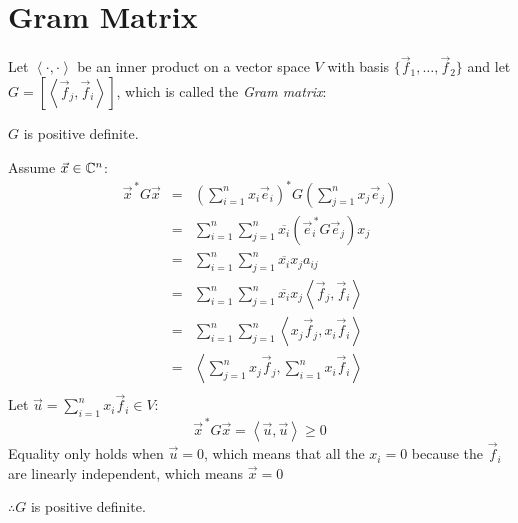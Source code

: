 \documentclass[letterpaper,12pt,fleqn]{article}
\newcommand{\inner}[2]{\left<#1,#2\right>}
\newcommand{\conj}[1]{\overline{#1}}
\newcommand{\vx}{\vec{x}}
\newcommand{\vxct}{\vx^{\,*}}
\newcommand{\ve}{\vec{e}}
\newcommand{\vect}{\ve^{\,*}}
\newcommand{\vf}{\vec{f}}
\newcommand{\vu}{\vec{u}}
\begin{document}
\section*{Gram Matrix}

\begin{theorem}
  Let $\inner{\cdot}{\cdot}$ be an inner product on a vector space $V$ with
  basis $\{\vf_1,\ldots,\vf_2\}$ and let $G=\left[\inner{\vf_j}{\vf_i}\right]$,
  which is called the \emph{Gram matrix}:

  $G$ is positive definite.
\end{theorem}

\begin{theproof}
  Assume $\vx\in\C^n$:
  \begin{eqnarray*}
    \vxct G\vx &=& \left(\sum_{i=1}^nx_i\ve_i\right)^*G
    \left(\sum_{j=1}^nx_j\ve_j\right) \\
    &=& \sum_{i=1}^n\sum_{j=1}^n\conj{x_i}(\vect_iG\ve_j)x_j \\
    &=& \sum_{i=1}^n\sum_{j=1}^n\conj{x_i}x_ja_{ij} \\
    &=& \sum_{i=1}^n\sum_{j=1}^n\conj{x_i}x_j\inner{\vf_j}{\vf_i} \\
    &=& \sum_{i=1}^n\sum_{j=1}^n\inner{x_j\vf_j}{x_i\vf_i} \\
    &=& \inner{\sum_{j=1}^nx_j\vf_j}{\sum_{i=1}^nx_i\vf_i} \\
  \end{eqnarray*}
  Let $\vu=\sum_{i=1}^nx_i\vf_i\in V$:
  \[\vxct G\vx = \inner{\vu}{\vu}\ge 0\]
  Equality only holds when $\vu=0$, which means that all the $x_i=0$ because the
  $\vf_i$ are linearly independent, which means $\vx=0$

  $\therefore G$ is positive definite.
\end{theproof}
\end{document}

